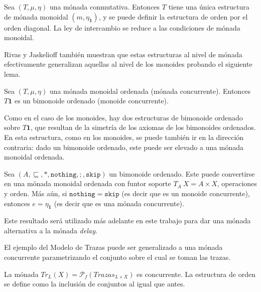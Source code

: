 \begin{ejemplo}
Sea $(\mathit{T},\mu,\eta)$ una mónada conmutativa. Entonces $\mathit{T}$ tiene una única estructura de mónada monoidal $(m,\eta_{\mathbf{1}})$, y se puede definir la estructura de orden por el orden diagonal. La ley de intercambio se reduce a las condiciones de mónada monoidal. 
\end{ejemplo}

Rivas y Jaskelioff \cite{rivas:2019} también muestran que estas estructuras al nivel de mónada efectivamente generalizan aquellas al nivel de los monoides probando el siguiente lema.

\begin{lema}
Sea $(\mathit{T},\mu,\eta)$ una mónada monoidal ordenada (mónada concurrente). Entonces $\mathit{T} \mathbf{1}$ es un bimonoide ordenado (monoide concurrente). 
\end{lema}

Como en el caso de los monoides, hay dos estructuras de bimonoide ordenado sobre $\mathit{T} \mathbf{1}$, que resultan de la simetría de los axiomas de los bimonoides ordenados.  En esta estructura, como en los monoides, se puede también ir en la dirección contraria: dado un bimonoide ordenado, este puede ser elevado a una mónada monoidal ordenada.

\begin{lema}\label{concmonoid->concmonad}
Sea $(A,\sqsubseteq,*,\mathtt{nothing},;,\mathtt{skip})$ un bimonoide ordenado. Este puede convertirse en una mónada monoidal ordenada con funtor soporte $\mathit{T}_A \ X = A \times X$, operaciones y orden. Más aún, si $\mathtt{nothing} = \mathtt{skip}$ (es decir que es un monoide concurrente), entonces $e = \eta_{\mathbf{1}}$ (es decir que es una mónada concurrente).
\end{lema}

Este resultado será utilizado más adelante en este trabajo para dar una mónada alternativa a la mónada \textit{delay}. 

El ejemplo del Modelo de Trazas puede ser generalizado a una mónada concurrente parametrizando el conjunto sobre el cual se toman las trazas. 

\begin{ejemplo}
La mónada $Tr_L(X) = \mathcal{P}_f(Trazas_{L \times X})$ es concurrente. La estructura de orden se define como la inclusión de conjuntos al igual que antes.
\end{ejemplo}
